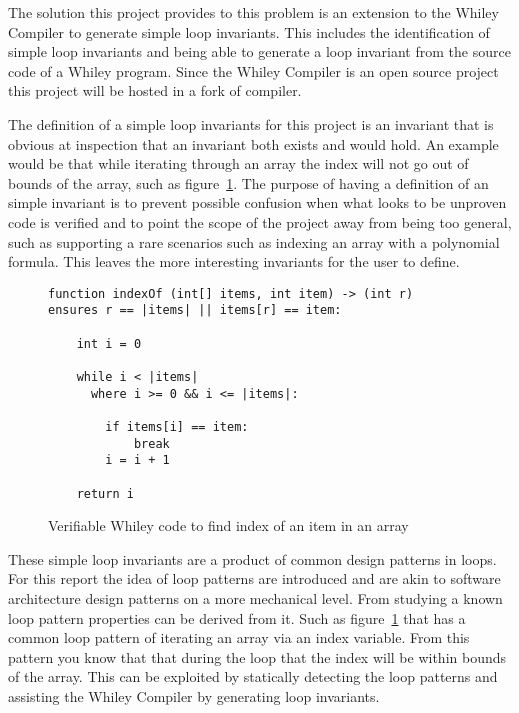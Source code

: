 The solution this project provides to this problem is an extension to
the Whiley Compiler to generate simple loop invariants.
This includes the identification of simple loop invariants and being able
to generate a loop invariant from the source code of a Whiley program.
Since the Whiley Compiler is an open source project this project will be
hosted in a fork of compiler.

The definition of a simple loop invariants for this project is an invariant that is
obvious at inspection that an invariant both exists and would hold.
An example would be that while iterating through an array the index
will not go out of bounds of the array, such as figure~\ref{lst:whiley-ex-1}.
The purpose of having a definition of an simple invariant is to prevent
possible confusion when what looks to be unproven code is verified and to point
the scope of the project away from being too general, such as supporting
a rare scenarios such as indexing an array with a polynomial formula.
This leaves the more interesting invariants for the user to define.

\begin{figure}[ht]
\begin{lstlisting}
function indexOf (int[] items, int item) -> (int r)
ensures r == |items| || items[r] == item:

    int i = 0

    while i < |items|
      where i >= 0 && i <= |items|:

        if items[i] == item:
            break
        i = i + 1

    return i
\end{lstlisting}
\caption{Verifiable Whiley code to find index of an item in an array}
\label{lst:whiley-ex-1}
\end{figure}

These simple loop invariants are a product of common design patterns in loops.
For this report the idea of loop patterns are introduced and are akin to
software architecture design patterns on a more mechanical level.
From studying a known loop pattern properties can be derived from it.
Such as figure~\ref{lst:whiley-ex-1} that has a common loop pattern of
iterating an array via an index variable.
From this pattern you know that that during the loop that the index will be
within bounds of the array.
This can be exploited by statically detecting the loop patterns and assisting
the Whiley Compiler by generating loop invariants.

